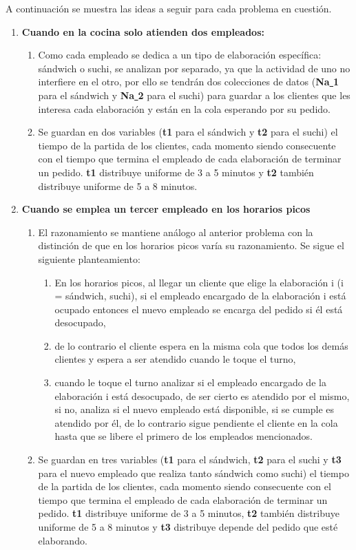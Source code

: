 \documentclass{book}
\begin{document}
	A continuaci\'on se muestra las ideas a seguir para cada problema en cuesti\'on.
	\begin{enumerate}
		\item \textbf{Cuando en la cocina solo atienden dos empleados:} 
			\begin{enumerate}
				\item Como cada empleado se dedica a un tipo de elaboraci\'on espec\'ifica: s\'andwich o suchi, se analizan por separado, ya que la actividad de uno no interfiere en el otro, por ello se tendr\'an dos colecciones de datos (\textbf{Na\underline{ }1} para el s\'andwich y \textbf{Na\underline{ }2} para el suchi) para guardar a los clientes que les interesa cada elaboraci\'on y est\'an en la cola esperando por su pedido. 
				\item Se guardan en dos variables (\textbf{t1} para el s\'andwich y \textbf{t2} para el suchi) el tiempo de la partida de los clientes, cada momento siendo consecuente con el tiempo que termina el empleado de cada elaboraci\'on de terminar un pedido. \textbf{t1} distribuye uniforme de 3 a 5 minutos y \textbf{t2} tambi\'en distribuye uniforme de 5 a 8 minutos.
			\end{enumerate}
		\item \textbf{Cuando se emplea un tercer empleado en los horarios picos}
			\begin{enumerate}
				\item El razonamiento se mantiene an\'alogo al anterior problema con la distinci\'on de que en los horarios picos var\'ia su razonamiento. Se sigue el siguiente planteamiento: 
				\begin{enumerate}
					\item En los horarios picos, al llegar un cliente que elige la elaboraci\'on i (i = s\'andwich, suchi), si el empleado encargado de la elaboraci\'on i est\'a ocupado entonces el nuevo empleado se encarga del pedido si \'el est\'a desocupado,
					\item de lo contrario el cliente espera en la misma cola que todos los dem\'as clientes y espera a ser atendido cuando le toque el turno,
					\item cuando le toque el turno analizar si el empleado encargado de la elaboraci\'on i est\'a desocupado, de ser cierto es atendido por el mismo, si no, analiza si el nuevo empleado est\'a disponible, si se cumple es atendido por \'el, de lo contrario sigue pendiente el cliente en la cola hasta que se libere el primero de los empleados mencionados.
				\end{enumerate}		
				\item Se guardan en tres variables (\textbf{t1} para el s\'andwich, \textbf{t2} para el suchi y \textbf{t3} para el nuevo empleado que realiza tanto s\'andwich como suchi) el tiempo de la partida de los clientes, cada momento siendo consecuente con el tiempo que termina el empleado de cada elaboraci\'on de terminar un pedido. \textbf{t1} distribuye uniforme de 3 a 5 minutos, \textbf{t2} tambi\'en distribuye uniforme de 5 a 8 minutos y \textbf{t3} distribuye depende del pedido que est\'e elaborando.		
			\end{enumerate}
	\end{enumerate}
\end{document}
